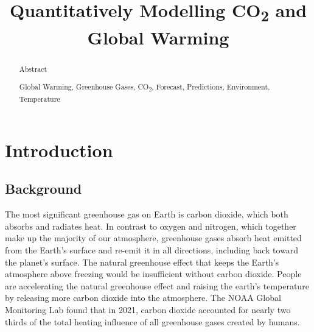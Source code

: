 \documentclass[12pt]{mcmthesis}
\begin{document}
    \graphicspath{ {./figs/} }

    \setlength{\abovedisplayskip}{3pt}
    \setlength{\belowdisplayskip}{3pt}
    \setlength{\abovedisplayshortskip}{-12pt}
    \setlength{\belowdisplayshortskip}{0pt}

    \setlength{\abovecaptionskip}{0pt}

    \title{Quantitatively Modelling CO\textsubscript{2} and Global Warming}


    \begin{abstract}
        Abstract

        \begin{keywords}
            Global Warming, Greenhouse Gases, CO\textsubscript{2}, Forecast, Predictions, Environment, Temperature
        \end{keywords}

    \end{abstract}

    \maketitle

    \setcounter{page}{2}

    \setlength{\cftparskip}{0pt}
    \tableofcontents

    \newpage


    


    \section{Introduction}

    \subsection{Background}
    The most significant greenhouse gas on Earth is carbon dioxide, which both absorbs and radiates heat. In contrast to oxygen and nitrogen, which together make up the majority of our atmosphere, greenhouse gases absorb heat emitted from the Earth's surface and re-emit it in all directions, including back toward the planet's surface. The natural greenhouse effect that keeps the Earth's atmosphere above freezing would be insufficient without carbon dioxide. People are accelerating the natural greenhouse effect and raising the earth's temperature by releasing more carbon dioxide into the atmosphere. The NOAA Global Monitoring Lab found that in 2021, carbon dioxide accounted for nearly two thirds of the total heating influence of all greenhouse gases created by humans.
\end{document}
